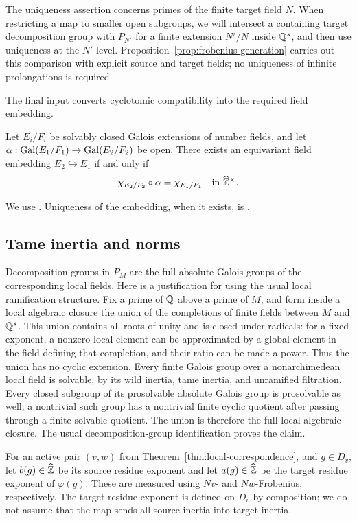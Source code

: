 The uniqueness assertion concerns primes of the finite target field $N$. When restricting a map to smaller open subgroups, we will intersect a containing target decomposition group with $P_{N'}$ for a finite extension $N'/N$ inside $\mathbb Q^s$, and then use uniqueness at the $N'$-level. Proposition~\ref{prop:frobenius-generation} carries out this comparison with explicit source and target fields; no uniqueness of infinite prolongations is required.

The final input converts cyclotomic compatibility into the required field embedding.
\begin{theorem}[Hoshi]\label{thm:hoshi}
Let $E_i/F_i$ be solvably closed Galois extensions of number fields, and let
$\alpha:\operatorname{Gal}(E_1/F_1)\to\operatorname{Gal}(E_2/F_2)$ be open. There exists an equivariant field embedding $E_2\hookrightarrow E_1$ if and only if
\[
 \chi_{E_2/F_2}\circ\alpha=\chi_{E_1/F_1}
 \quad\text{in }\widehat{\mathbb Z}^{\times}.
\]
\end{theorem}
We use \cite[Theorem~3.4]{hoshi2025}. Uniqueness of the embedding, when it exists, is \cite[Proposition~2]{uchida1981}.

\subsection{Tame inertia and norms}
Decomposition groups in $P_M$ are the full absolute Galois groups of the corresponding local fields. Here is a justification for using the usual local ramification structure. Fix a prime of $\overline{\mathbb Q}$ above a prime of $M$, and form inside a local algebraic closure the union of the completions of finite fields between $M$ and $\mathbb Q^s$. This union contains all roots of unity and is closed under radicals: for a fixed exponent, a nonzero local element can be approximated by a global element in the field defining that completion, and their ratio can be made a power. Thus the union has no cyclic extension. Every finite Galois group over a nonarchimedean local field is solvable, by its wild inertia, tame inertia, and unramified filtration. Every closed subgroup of its prosolvable absolute Galois group is prosolvable as well; a nontrivial such group has a nontrivial finite cyclic quotient after passing through a finite solvable quotient. The union is therefore the full local algebraic closure. The usual decomposition-group identification proves the claim.

For an active pair $(v,w)$ from Theorem~\ref{thm:local-correspondence}, and $g\in D_v$, let $b(g)\in\widehat{\mathbb Z}$ be its source residue exponent and let $a(g)\in\widehat{\mathbb Z}$ be the target residue exponent of $\varphi(g)$. These are measured using $Nv$- and $Nw$-Frobenius, respectively. The target residue exponent is defined on $D_v$ by composition; we do not assume that the map sends all source inertia into target inertia.

